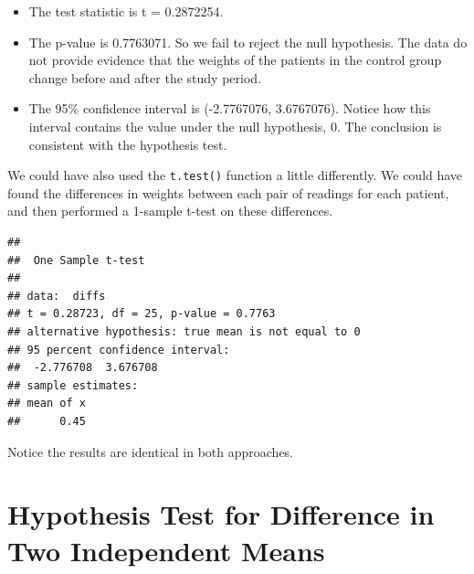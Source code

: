 \documentclass[
]{book}
\newenvironment{Shaded}{\begin{snugshade}}{\end{snugshade}}
\newcommand{\AttributeTok}[1]{\textcolor[rgb]{0.13,0.29,0.53}{#1}}
\newcommand{\ConstantTok}[1]{\textcolor[rgb]{0.56,0.35,0.01}{#1}}
\newcommand{\DecValTok}[1]{\textcolor[rgb]{0.00,0.00,0.81}{#1}}
\newcommand{\DocumentationTok}[1]{\textcolor[rgb]{0.56,0.35,0.01}{\textbf{\textit{#1}}}}
\newcommand{\FunctionTok}[1]{\textcolor[rgb]{0.13,0.29,0.53}{\textbf{#1}}}
\newcommand{\NormalTok}[1]{#1}
\newcommand{\OtherTok}[1]{\textcolor[rgb]{0.56,0.35,0.01}{#1}}
\newcommand{\SpecialCharTok}[1]{\textcolor[rgb]{0.81,0.36,0.00}{\textbf{#1}}}
\newcommand{\StringTok}[1]{\textcolor[rgb]{0.31,0.60,0.02}{#1}}
\providecommand{\tightlist}{%
  \setlength{\itemsep}{0pt}\setlength{\parskip}{0pt}}
\theoremstyle{definition}
\theoremstyle{definition}
\theoremstyle{definition}
\theoremstyle{definition}
\theoremstyle{remark}
\begin{document}
\begin{itemize}
\tightlist
\item
  The test statistic is t = 0.2872254.
\item
  The p-value is 0.7763071. So we fail to reject the null hypothesis. The data do not provide evidence that the weights of the patients in the control group change before and after the study period.
\item
  The 95\% confidence interval is (-2.7767076, 3.6767076). Notice how this interval contains the value under the null hypothesis, 0. The conclusion is consistent with the hypothesis test.
\end{itemize}

We could have also used the \texttt{t.test()} function a little differently. We could have found the differences in weights between each pair of readings for each patient, and then performed a 1-sample t-test on these differences.

\begin{Shaded}
\end{Shaded}

\begin{verbatim}
## 
##  One Sample t-test
## 
## data:  diffs
## t = 0.28723, df = 25, p-value = 0.7763
## alternative hypothesis: true mean is not equal to 0
## 95 percent confidence interval:
##  -2.776708  3.676708
## sample estimates:
## mean of x 
##      0.45
\end{verbatim}

Notice the results are identical in both approaches.

\hypertarget{hypothesis-test-for-difference-in-two-independent-means}{%
\section{Hypothesis Test for Difference in Two Independent Means}\label{hypothesis-test-for-difference-in-two-independent-means}}
\end{document}
